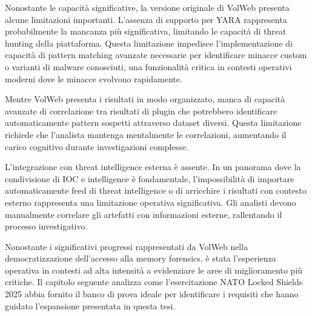 Nonostante le capacità significative, la versione originale di VolWeb presenta alcune limitazioni importanti. L'assenza di supporto per YARA rappresenta probabilmente la mancanza più significativa, limitando le capacità di threat hunting della piattaforma. Questa limitazione impedisce l'implementazione di capacità di pattern matching avanzate necessarie per identificare minacce custom o varianti di malware conosciuti, una funzionalità critica in contesti operativi moderni dove le minacce evolvono rapidamente.

Mentre VolWeb presenta i risultati in modo organizzato, manca di capacità avanzate di correlazione tra risultati di plugin che potrebbero identificare automaticamente pattern sospetti attraverso dataset diversi. Questa limitazione richiede che l'analista mantenga mentalmente le correlazioni, aumentando il carico cognitivo durante investigazioni complesse.

L'integrazione con threat intelligence esterna è assente. In un panorama dove la condivisione di IOC e intelligence è fondamentale, l'impossibilità di importare automaticamente feed di threat intelligence o di arricchire i risultati con contesto esterno rappresenta una limitazione operativa significativa. Gli analisti devono manualmente correlare gli artefatti con informazioni esterne, rallentando il processo investigativo.

Nonostante i significativi progressi rappresentati da VolWeb nella democratizzazione dell'accesso alla memory forensics, è stata l'esperienza operativa in contesti ad alta intensità a evidenziare le aree di miglioramento più critiche. Il capitolo seguente analizza come l'esercitazione NATO Locked Shields 2025 abbia fornito il banco di prova ideale per identificare i requisiti che hanno guidato l'espansione presentata in questa tesi.